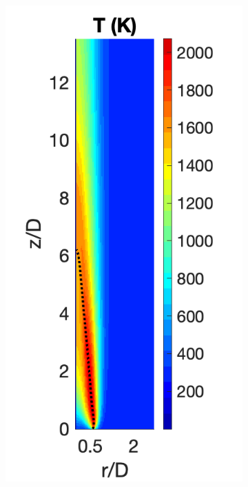 \documentclass[12pt]{CHT-20}
\begin{document}
\begin{figure}[H]
     \centering
     \begin{subfigure}[b]{0.245\textwidth}
         \centering
         \includegraphics[width=\textwidth]{figures/santoro/Tcontour.png}

\end{subfigure}
\end{figure}
\end{document}
